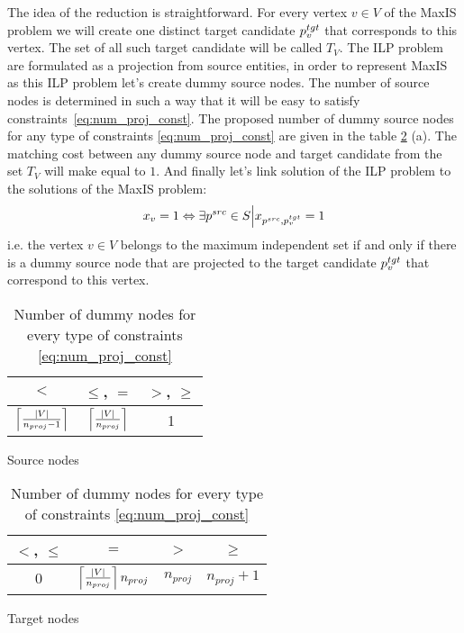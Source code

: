 The idea of the reduction is straightforward. For every vertex \( v \in V \) of the MaxIS problem
we will create one distinct target candidate \( p_v^{tgt} \) that corresponds to this vertex.
The set of all such target candidate will be called \( T_V \). The ILP problem are formulated as a projection
from source entities, in order to represent MaxIS as this ILP problem let's create dummy source nodes. The number of source nodes
is determined in such a way that it will be easy to satisfy constraints~\eqref{eq:num_proj_const}.
The proposed number of dummy source nodes for any type of constraints \eqref{eq:num_proj_const} are given
in the table \ref{tab:dummy_nodes_num} (a). The matching cost between any dummy source node and
target candidate from the set \( T_V \) will make equal to \( 1 \). And finally let's link solution of the
ILP problem to the solutions of the MaxIS problem:
\[
  x_v = 1 \Leftrightarrow \exists p^{src} \in S \Big| x_{p^{src}, p_v^{tgt}} = 1
\]
i.e. the vertex \( v \in V \) belongs to the maximum independent set if and only if there is a dummy
source node that are projected to the target candidate \( p_v^{tgt} \) that correspond to this vertex.

\begin{table}[h]
  \begin{subtable}[t]{0.5\linewidth}
    \centering
    \renewcommand{\arraystretch}{1.5}
    \begin{tabular}{|c|c|c|}
      \hline
      \(<\)                                 & \( \leq \), \( = \)               & \(>\), \( \geq \) \\
      \hline
      \( \left\lceil \frac{|V|}{n_{proj} - 1} \right\rceil \) & \( \left\lceil \frac{|V|}{n_{proj}} \right\rceil \) & 1                 \\
      \hline
    \end{tabular}
    \caption{Source nodes}
    \label{tab:src_dummy_nodes_num}
  \end{subtable}
  \begin{subtable}[t]{0.5\linewidth}
    \centering
    \renewcommand{\arraystretch}{1.5}
    \begin{tabular}{|c|c|c|c|}
      \hline
      \(<\), \(\leq\) & \( = \)                                    & \(>\)          & \( \geq \)         \\
      \hline
      \( 0 \)         & \( \left\lceil \frac{|V|}{n_{proj}} \right\rceil n_{proj} \) & \( n_{proj} \) & \( n_{proj} + 1 \) \\
      \hline
    \end{tabular}
    \caption{Target nodes}
    \label{tab:tgt_dummy_nodes_num}
  \end{subtable}
  \caption{Number of dummy nodes for every type of constraints \eqref{eq:num_proj_const}}
  \label{tab:dummy_nodes_num}
\end{table}

